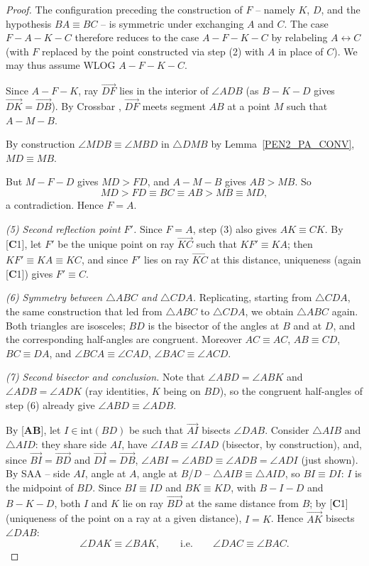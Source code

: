 \documentclass[11pt,a4paper]{article}
\theoremstyle{definition}
\theoremstyle{remark}
\numberwithin{equation}{section}
\begin{document}
\begin{proof}
The configuration preceding the construction of $F$ -- namely $K$, $D$, and the hypothesis
$BA\equiv BC$ -- is symmetric under exchanging $A$ and $C$. The case $F-A-K-C$ therefore
reduces to the case $A-F-K-C$ by relabeling $A\leftrightarrow C$ (with $F$ replaced by the
point constructed via step (2) with $A$ in place of $C$). We may thus assume WLOG
$A-F-K-C$.

Since $A-F-K$, ray $\overrightarrow{DF}$ lies in the interior of $\angle ADB$ (as $B-K-D$
gives $\overrightarrow{DK}=\overrightarrow{DB}$). By Crossbar \cite[p.~82]{Greenberg1993},
$\overrightarrow{DF}$ meets segment $AB$ at a point $M$ such that $A-M-B$.

By construction $\angle MDB\equiv\angle MBD$ in $\triangle DMB$ by Lemma~\ref{PEN2_PA_CONV}, $MD\equiv MB$.

But $M-F-D$ gives $MD>FD$, and $A-M-B$ gives $AB>MB$. So
\begin{equation*}
MD>FD\equiv BC\equiv AB>MB\equiv MD,
\end{equation*}
a contradiction. Hence $F=A$.

\emph{(5) Second reflection point $F'$.} Since $F=A$, step (3) also gives $AK\equiv CK$. By
[\textbf{C}1], let $F'$ be the unique point on ray $\overrightarrow{KC}$ such that
$KF'\equiv KA$; then $KF'\equiv KA\equiv KC$, and since $F'$ lies on ray
$\overrightarrow{KC}$ at this distance, uniqueness (again [\textbf{C}1]) gives $F'\equiv C$.

\emph{(6) Symmetry between $\triangle ABC$ and $\triangle CDA$.} Replicating, starting from
$\triangle CDA$, the same construction that led from $\triangle ABC$ to $\triangle CDA$, we
obtain $\triangle ABC$ again. Both triangles are isosceles; $BD$ is the bisector of the
angles at $B$ and at $D$, and the corresponding half-angles are congruent. Moreover
$AC\equiv AC$, $AB\equiv CD$, $BC\equiv DA$, and $\angle BCA\equiv\angle CAD$,
$\angle BAC\equiv\angle ACD$.

\emph{(7) Second bisector and conclusion.} Note that $\angle ABD=\angle ABK$ and
$\angle ADB=\angle ADK$ (ray identities, $K$ being on $BD$), so the congruent half-angles of
step (6) already give $\angle ABD\equiv\angle ADB$.

By [\textbf{AB}], let $I\in\mathrm{int}(BD)$ be such that $\overrightarrow{AI}$ bisects
$\angle DAB$. Consider $\triangle AIB$ and $\triangle AID$: they share side $AI$, have
$\angle IAB\equiv\angle IAD$ (bisector, by construction), and, since
$\overrightarrow{BI}=\overrightarrow{BD}$ and $\overrightarrow{DI}=\overrightarrow{DB}$,
$\angle ABI=\angle ABD\equiv\angle ADB=\angle ADI$ (just shown). By SAA -- side $AI$, angle
at $A$, angle at $B$/$D$ -- $\triangle AIB\equiv\triangle AID$, so $BI\equiv DI$: $I$ is the
midpoint of $BD$. Since $BI\equiv ID$ and $BK\equiv KD$, with $B-I-D$ and $B-K-D$, both $I$
and $K$ lie on ray $\overrightarrow{BD}$ at the same distance from $B$; by [\textbf{C}1]
(uniqueness of the point on a ray at a given distance), $I=K$. Hence $\overrightarrow{AK}$
bisects $\angle DAB$:
\begin{equation*}
\angle DAK\equiv\angle BAK,\qquad\text{i.e.}\qquad \angle DAC\equiv\angle BAC.
\end{equation*}


\end{proof}
\end{document}
